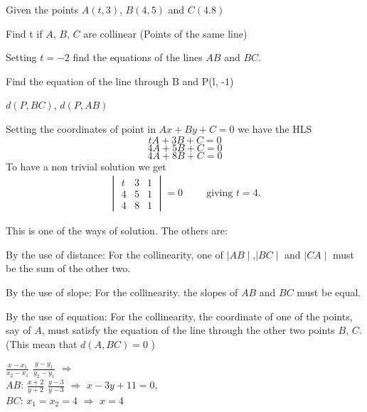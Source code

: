 \documentclass[11pt]{amsbook}
\begin{document}

\begin{exmp}
	 Given the points $A(t, 3)$, $B(4, 5)$ and $C(4.8)$ 
	\begin{hEnumerateAlpha}
		\item Find t if $A$, $B$, $C$ are collinear (Points of the same line) 

		\item Setting $t=-2$ find the equations of the lines $AB$ and $BC$. 

		\item Find the equation of the line through B and P(l, -1) 

		\item $d(P, BC)$, $d(P, AB)$ 
	\end{hEnumerateAlpha}

	\begin{hSolution}
		\begin{hEnumerateAlpha}
			\item Setting the coordinates of point in $Ax + By + C = 0$  we have the HLS 
			$$tA + 3B + C = 0$$ $$4A + 5B + C = 0$$ $$4A + 8B + C = 0$$ 
			To have a non trivial solution we get
		 \begin{align*}
			\begin{vmatrix}
			t & 3 & 1 \\ 
			4 & 5 & 1 \\
			4 & 8 & 1 
			\end{vmatrix}
			=0   
			\hspace{1cm}  \text{giving  $t = 4$.} 
		\end{align*}
	
   
   	       This is one of the ways of solution. The others are:
	       \begin{hEnumerateArabic}
			\item  By the use of distance: For the collinearity, one of $\mid AB \mid$,$\mid BC \mid$ and $\mid CA \mid$ must be the sum of the 				other two.
			\item By the use of slope: For the collinearity. the slopes of $AB$ and $BC$ must be equal. 
			\item By the use of equation: For the collinearity, the coordinate of one of the points, say of $A$, must satisfy the equation of the line 					through the other two points $B$, $C$. (This mean that $d(A, BC) = 0$ )
		\end{hEnumerateArabic}
	
		 \item \( \frac{x - x_1}{x_2 - x_1} \) \( \frac{y - y_1}{y_2 - y_1} \) $\Rightarrow$ \\
   		  
		  $AB$: \( \frac{x + 2}{y + 2} \) \( \frac{y - 3}{y - 3} \) $\Rightarrow$ $x - 3y + 11 = 0$, \\	
   
       		  $BC$: $x_1 = x_2 = 4$ $\Rightarrow$ $x = 4$
		
		\end{hEnumerateAlpha}
	\end{hSolution}
\end{exmp}
\end{document}
